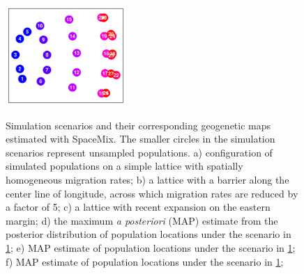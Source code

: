 \documentclass[10pt,letterpaper]{article}
\begin{document}
\begin{figure}
			{\includegraphics[width=1.8in,height=1.5in]{../figs/sims/GeoGenMap_expansion.pdf}}

	\caption{
    Simulation scenarios and their corresponding geogenetic maps estimated with SpaceMix.  
    The smaller circles in the simulation scenarios represent unsampled populations.  
    a) configuration of simulated populations on a simple lattice with spatially homogeneous migration rates; 
    b) a lattice with a barrier along the center line of longitude, across which migration rates are reduced by a factor of 5; 
    c) a lattice with recent expansion on the eastern margin; 
    d) the maximum \textit{a posteriori} (MAP) estimate from the posterior distribution of population locations under the scenario in \ref{sfig:lattice_scenarios}; 
    e) MAP estimate of population locations under the scenario in \ref{sfig:lattice_scenarios};
    f) MAP estimate of population locations under the scenario in \ref{sfig:lattice_scenarios};
    }\label{sfig:lattice_scenarios}
\end{figure}
\end{document}
